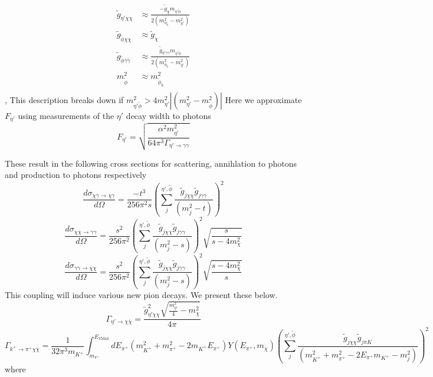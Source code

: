 \begin{equation}
\begin{split}
    \tilde{g}_{\eta'\chi\chi }&\approx\frac{-\tilde{g}_{\chi}m_{\eta'\tilde{\phi}}}{2(m_{\phi_b}^2-m_{\eta'}^2)}   \\
    \tilde{g}_{\tilde{\phi}\chi\chi }&\approx\tilde{g}_{\chi}\\
    \tilde{g}_{\tilde{\phi}\gamma\gamma }&\approx\frac{\tilde{g}_{\eta'\gamma \gamma}m_{\eta'\tilde{\phi}}}{2(m_{\phi_b}^2-m_{\eta'}^2)}   \\
    m_{\tilde{\phi}}^2&\approx m_{\tilde{\phi}_b}^2\\
\end{split}
\end{equation},  This description breaks down if $m_{\eta'\tilde{\phi}}^2>4m_{\eta'}^2|(m_{\eta'}^2-m_{\tilde{\phi}}^2)|$
Here we approximate $F_{\eta'}$ using measurements of the $\eta'$ decay width to photons 
\begin{equation}
    F_{\eta'} = \sqrt{\frac{\alpha^2 m_{\eta'}^2}{64\pi^3\Gamma_{\eta'\rightarrow\gamma\gamma}}}
\end{equation}

These result in the following cross sections for scattering, annihlation to photons and production to photons respectively
\begin{equation}
    \frac{d\sigma_{\chi \gamma \rightarrow \chi \gamma}}{d\Omega}=\frac{- t^3}{256\pi^2 s }\left(\sum_j^{\eta', \tilde{\phi}}\frac{\tilde{g}_{j\chi\chi  } \tilde{g}_{j\gamma \gamma}}{(m_{j}^2-t)}\right)^2
    \end{equation}
    \begin{equation}
    \frac{d\sigma_{\chi \chi \rightarrow \gamma \gamma}}{d\Omega}=\frac{s^2}{256\pi^2 }\left(\sum_j^{\eta', \tilde{\phi}}\frac{\tilde{g}_{j\chi\chi  } \tilde{g}_{j\gamma \gamma}}{(m_{j}^2-s)}\right)^2\sqrt{\frac{s}{s-4m_\chi^2}}
\end{equation}
\begin{equation}
     \frac{d\sigma_{ \gamma \gamma\rightarrow \chi \chi}}{d\Omega}=\frac{s^2}{256\pi^2 }\left(\sum_j^{\eta', \tilde{\phi}}\frac{\tilde{g}_{j\chi\chi  } \tilde{g}_{j\gamma \gamma}}{(m_{j}^2-s)}\right)^2\sqrt{\frac{s-4m_\chi^2}{s}}
\end{equation}
This coupling will induce various new pion decays.  We present these below.
\begin{equation}
    \Gamma_{\eta'\rightarrow{\chi\bar{\chi}}} = \frac{\tilde{g}_{\eta'\chi\chi}^2\sqrt{\frac{m_{\eta'}^2}{4}-m_{\chi}^2}}{4\pi}
\end{equation}
\begin{equation}
    \Gamma_{k^+\rightarrow\pi^+\chi\bar{\chi}} = \frac{1}{32\pi^3m_{K^+}}\int_{m_{\pi^+}}^{E_{\pi \text{Max}}}dE_{\pi^+}(m_{K^+}^2+m_{\pi^+}^2-2m_{K^+}E_{\pi^+})Y(E_{\pi^+},m_{\chi})\left( \sum_j^{\eta', \tilde{\phi}} \frac{\tilde{g}_{j\chi\chi}\tilde{g}_{j\pi K}}{(m_{K^+}^2+m_{\pi^+}^2-2E_{\pi^+}m_{K^+}-m_{j}^2)}\right)^2
\end{equation}
where

